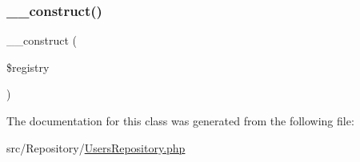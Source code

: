 \subsubsection{\texorpdfstring{\+\_\+\+\_\+construct()}{\_\_construct()}}
{\footnotesize\ttfamily \+\_\+\+\_\+construct (\begin{DoxyParamCaption}\item[{Manager\+Registry}]{\$registry }\end{DoxyParamCaption})}



The documentation for this class was generated from the following file\+:\begin{DoxyCompactItemize}
\item 
src/\+Repository/\mbox{\hyperlink{_users_repository_8php}{Users\+Repository.\+php}}\end{DoxyCompactItemize}
